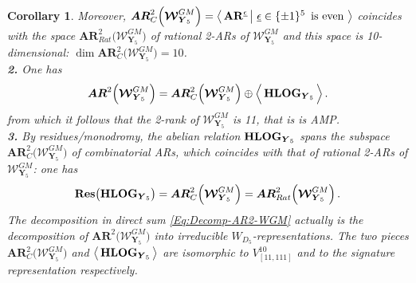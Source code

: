 \documentclass[11pt]{amsart}
\newcommand{\sk}{\smallskip}
\newcommand{\mk}{\medskip}
\newtheorem{cor}[thm]{Corollary}
\begin{document}
\begin{cor}
Moreover, 
$\boldsymbol{AR}^2_C\Big( \boldsymbol{\mathcal W}_{\boldsymbol{Y}_5}^{GM}\Big)=
\big\langle \,{\bf AR}^{\underline{\epsilon}} \, \big\lvert \, \,
\underline{\epsilon}\in \{\pm1\}^5 \, \mbox{ is even} \,
\, \big\rangle $ coincides with the space $\boldsymbol{AR}^2_{Rat}\Big( \boldsymbol{\mathcal W}_{\boldsymbol{Y}_5}^{GM}\Big)$
of rational 2-ARs of $\boldsymbol{\mathcal W}_{\boldsymbol{Y}_5}^{GM}$ and this space is 10-dimensional: $ \dim \boldsymbol{AR}^2_C\Big( \boldsymbol{\mathcal W}_{\boldsymbol{Y}_5}^{GM}\Big)=10$.
\mk \\
{\bf 2.}
One has 
\begin{equation}
\label{Eq:Decomp-AR2-WGM}
\boldsymbol{AR}^2\Big( \boldsymbol{\mathcal W}_{\boldsymbol{Y}_5}^{GM}\Big)
=\boldsymbol{AR}^2_C\Big( \boldsymbol{\mathcal W}_{\boldsymbol{Y}_5}^{GM}\Big)\oplus \Big\langle \,
 {\bf HLOG}_{ \boldsymbol{Y}_5}\,
\Big\rangle\, . 
\end{equation}
from which it follows that the 2-rank of 
$\boldsymbol{\mathcal W}_{\boldsymbol{Y}_5}^{GM}$ is 11, that is is  AMP. 
\sk \\
{\bf 3.} By residues/monodromy, the abelian relation 
$ {\bf HLOG}_{ \boldsymbol{Y}_5}$
  spans  the subspace $\boldsymbol{AR}^2_C\Big( \boldsymbol{\mathcal W}_{\boldsymbol{Y}_5}^{GM}\Big)$ 
  of combinatorial ARs, which coincides with that of rational 2-ARs of $\boldsymbol{\mathcal W}_{\boldsymbol{Y}_5}^{GM}$: one has 
  $$
  {\bf Res}\big( {\bf HLOG}_{ \boldsymbol{Y}_5} \big) 
  = 
  \boldsymbol{AR}^2_C\Big( \boldsymbol{\mathcal W}_{\boldsymbol{Y}_5}^{GM}\Big)=\boldsymbol{AR}^2_{Rat}\Big( \boldsymbol{\mathcal W}_{\boldsymbol{Y}_5}^{GM}\Big)
  \, .
  $$
 The decomposition in direct sum \eqref{Eq:Decomp-AR2-WGM} actually is the decomposition of $\boldsymbol{AR}^2\Big( \boldsymbol{\mathcal W}_{\boldsymbol{Y}_5}^{GM}\Big)$ 
into irreducible $W_{D_5}$-representations. The two pieces $\boldsymbol{AR}^2_C\Big( \boldsymbol{\mathcal W}_{\boldsymbol{Y}_5}^{GM}\Big)$ 
and $\big\langle \,
 {\bf HLOG}_{ \boldsymbol{Y}_5}\,
\big\rangle$ are  isomorphic to $V_{[11,111]}^{10}$ and to the signature representation respectively. 
\mk \\
\end{cor}%
\end{document}
